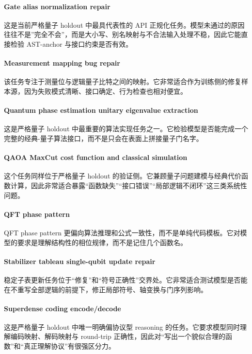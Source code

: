 \documentclass[11pt,a4paper]{article}
\begin{document}
\paragraph{Gate alias normalization repair}
这是当前严格量子 holdout 中最具代表性的 API 正规化任务。模型未通过的原因往往不是”完全不会”，而是大小写、别名映射与不合法输入处理不稳，因此它能直接检验 AST-anchor 与接口约束是否有效。

\paragraph{Measurement mapping bug repair}
该任务专注于测量位与逻辑量子比特之间的映射。它非常适合作为训练侧的修复样本源，因为失败模式清晰、接口确定、行为检查也相对便宜。

\paragraph{Quantum phase estimation unitary eigenvalue extraction}
这是严格量子 holdout 中最重要的算法实现任务之一。它检验模型是否能完成一个完整的经典-量子算法接口，而不是只会在表面上拼接量子门名字。

\paragraph{QAOA MaxCut cost function and classical simulation}
这个任务同样位于严格量子 holdout 的验证侧。它兼顾量子问题建模与经典代价函数计算，因此非常适合暴露“函数缺失”“接口错误”“局部逻辑不闭环”这三类系统性问题。

\paragraph{QFT phase pattern}
QFT phase pattern 更偏向算法推理和公式一致性，而不是单纯代码模板。它对模型的要求是理解结构性的相位规律，而不是记住几个函数名。

\paragraph{Stabilizer tableau single-qubit update repair}
稳定子表更新任务位于“修复”和“符号正确性”交界处。它非常适合测试模型是否能在不重写全部逻辑的前提下，修正局部符号、轴变换与门序列影响。

\paragraph{Superdense coding encode/decode}
这是严格量子 holdout 中唯一明确偏协议型 reasoning 的任务。它要求模型同时理解编码映射、解码映射与 round-trip 正确性，因此对“写出一个貌似合理的函数”和“真正理解协议”有很强区分力。
\end{document}
